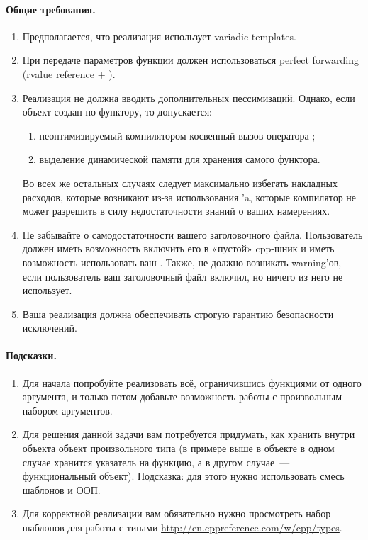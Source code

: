 \documentclass[a4paper,10pt]{article}
\begin{document}
\paragraph{Общие требования.}
\begin{enumerate}
    \item Предполагается, что реализация использует variadic templates.
    \item При передаче параметров функции должен использоваться perfect
        forwarding (rvalue reference $+$ ).
\item Реализация не должна вводить дополнительных пессимизаций. Однако, если объект
     создан по функтору, то допускается:
    \begin{enumerate}
        \item неоптимизируемый компилятором косвенный вызов оператора \cpp{()};
        \item выделение динамической памяти для хранения самого функтора.
    \end{enumerate}
    Во всех же остальных случаях следует максимально избегать накладных расходов, которые
    возникают из-за использования ’a, которые компилятор не может
    разрешить в силу недостаточности знаний о ваших намерениях.
    
\item Не забывайте о самодостаточности вашего заголовочного файла. Пользователь должен
иметь возможность включить его в «пустой» cpp-шник и иметь возможность использовать
ваш . Также, не должно возникать warning’ов, если пользователь ваш
заголовочный файл включил, но ничего из него не использует.
    \item Ваша реализация должна обеспечивать строгую гарантию безопасности исключений.
\end{enumerate}

\paragraph{Подсказки.} 
\begin{enumerate}
    \item Для начала попробуйте реализовать всё, ограничившись функциями от
        одного аргумента, и только потом добавьте возможность работы с
        произвольным набором аргументов.

    \item Для решения данной задачи вам потребуется придумать, как
        хранить внутри объекта  объект произвольного типа (в примере выше
        в объекте  в одном случае хранится указатель на
        функцию, а в другом случае~--- функциональный объект). Подсказка: для этого нужно 
        использовать смесь шаблонов и ООП.

    \item Для корректной реализации вам обязательно нужно просмотреть набор
        шаблонов для работы с типами \url{http://en.cppreference.com/w/cpp/types}.
\end{enumerate}
\end{document}
